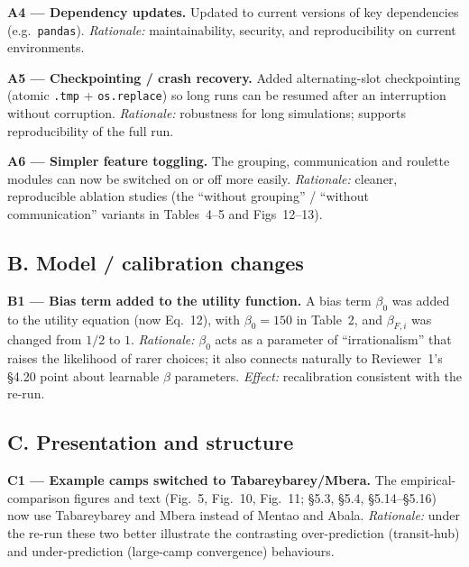\documentclass[11pt,a4paper]{article}
\begin{document}
\begin{authorbox}
\textbf{A4 --- Dependency updates.} Updated to current versions of key dependencies (e.g.\ \texttt{pandas}).
\emph{Rationale:} maintainability, security, and reproducibility on current environments.
\end{authorbox}

\begin{authorbox}
\textbf{A5 --- Checkpointing / crash recovery.} Added alternating-slot checkpointing (atomic \texttt{.tmp} +
\texttt{os.replace}) so long runs can be resumed after an interruption without corruption. \emph{Rationale:}
robustness for long simulations; supports reproducibility of the full run.
\end{authorbox}

\begin{authorbox}
\textbf{A6 --- Simpler feature toggling.} The grouping, communication and roulette modules can now be switched on
or off more easily. \emph{Rationale:} cleaner, reproducible ablation studies (the ``without grouping'' / ``without
communication'' variants in Tables~4--5 and Figs~12--13).
\end{authorbox}

\subsection*{B. Model / calibration changes}

\begin{authorbox}
\textbf{B1 --- Bias term added to the utility function.} A bias term $\beta_0$ was added to the utility equation
(now Eq.~12), with $\beta_0 = 150$ in Table~2, and $\beta_{F,i}$ was changed from $1/2$ to $1$. \emph{Rationale:}
$\beta_0$ acts as a parameter of ``irrationalism'' that raises the likelihood of rarer choices; it also connects
naturally to Reviewer~1's §4.20 point about learnable $\beta$ parameters. \emph{Effect:} recalibration consistent
with the re-run.
\end{authorbox}

\subsection*{C. Presentation and structure}

\begin{authorbox}
\textbf{C1 --- Example camps switched to Tabareybarey/Mbera.} The empirical-comparison figures and text (Fig.~5,
Fig.~10, Fig.~11; §5.3, §5.4, §5.14--§5.16) now use Tabareybarey and Mbera instead of Mentao and Abala.
\emph{Rationale:} under the re-run these two better illustrate the contrasting over-prediction (transit-hub) and
under-prediction (large-camp convergence) behaviours.
\end{authorbox}
\end{document}
